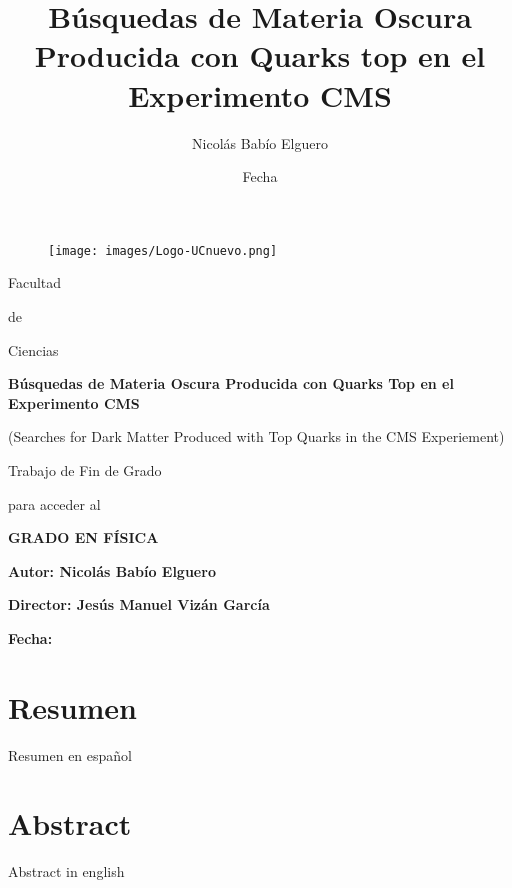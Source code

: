 \documentclass[11pt, oneside]{book}
\title{Búsquedas de Materia Oscura Producida con Quarks top en el Experimento CMS}
\author{Nicolás Babío Elguero}
\date{Fecha}
\begin{document}
\frontmatter
\thispagestyle{empty}

\vspace{0.3cm}
\begin{figure}[H]
    \centering
    \texttt{[image: images/Logo-UCnuevo.png]}
    \label{logo 50UC}
\end{figure}

\begin{center}
    \vspace{0.3cm}
    \huge
    Facultad

    de

    Ciencias

    \vspace{1.4cm}

    \huge
    \textbf{Búsquedas de Materia Oscura Producida con Quarks Top en el Experimento CMS}

    \vspace{0.3cm}
    \LARGE
    (Searches for Dark Matter Produced with Top Quarks in the CMS Experiement)

    \vspace{2cm}
    \Large
    Trabajo de Fin de Grado

    para acceder al
    \vspace{0.4cm}

    \textbf{GRADO EN FÍSICA}
    \vspace{2cm}
\end{center}

\begin{flushright}
    \Large
    \textbf{Autor: Nicolás Babío Elguero}

    \vspace{0.3cm}\textbf{
    Director: Jesús Manuel Vizán García}

    \vspace{0.3cm} \textbf{
    Fecha: }
\end{flushright}


\newpage{\ }
\thispagestyle{empty}


\newpage{\ }
\thispagestyle{empty}

\chapter*{Resumen}
Resumen en español

\chapter*{Abstract}
Abstract in english
\end{document}
